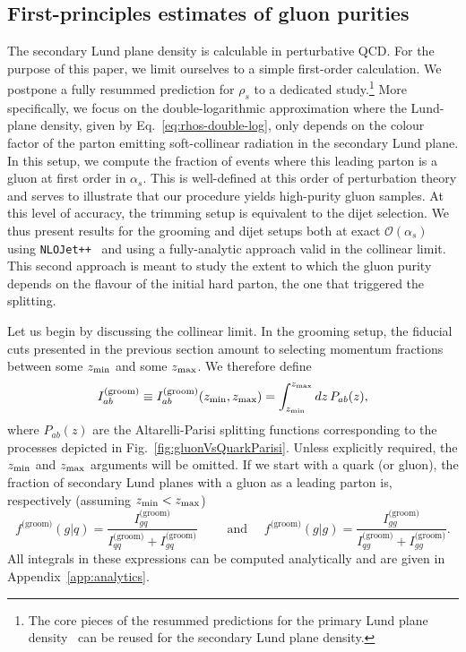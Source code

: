 \documentclass[a4paper,11pt]{article}
\newcommand{\zmin}{z_{\rm{min}}}
\newcommand{\zmax}{z_{\rm{max}}}
\begin{document}
\subsection{First-principles estimates of gluon purities}
\label{sec:analytics}
The secondary Lund plane density is calculable in perturbative QCD. For the purpose of this paper, we limit ourselves to a simple first-order calculation. We postpone a fully resummed prediction for $\rho_s$ to a dedicated study.\footnote{The core pieces of the resummed predictions for the primary Lund plane density~\cite{Lifson:2020gua} can be reused for the secondary Lund plane density.} 
%
More specifically, we focus on the double-logarithmic approximation where the Lund-plane density, given by Eq.~\eqref{eq:rhos-double-log}, only depends on the colour factor of the parton emitting soft-collinear radiation in the secondary Lund plane.
%
In this setup, we compute the fraction of events where this leading parton is a gluon at first order in $\alpha_s$. This is well-defined at this order of perturbation theory and serves to illustrate that our procedure yields high-purity gluon samples. 
%
At this level of accuracy, the trimming setup is equivalent to the dijet selection. We thus present results for the grooming and dijet setups both at exact $\mathcal{O}(\alpha_s)$ using \texttt{NLOJet++}~\cite{Nagy:2003tz} and using a fully-analytic approach valid in the collinear limit. 
%
This second approach is meant to study the extent to which the gluon purity depends on the flavour of the initial hard parton, the one that triggered the splitting.

Let us begin by discussing the collinear limit. In the grooming setup, the fiducial cuts presented in the previous section amount to selecting momentum fractions between some $\zmin$ and some $\zmax$. We therefore define
%
\begin{equation}
\label{eq:int-Pab}
I^\text{(groom)}_{ab} \equiv I^\text{(groom)}_{ab}(\zmin,\zmax) = \int_{\zmin}^{\zmax} dz\, P_{ab}(z),
\end{equation}
%
where $P_{ab}(z)$ are the Altarelli-Parisi splitting functions corresponding to the processes depicted in Fig.~\ref{fig:gluonVsQuarkParisi}. Unless explicitly required, the $\zmin$ and $\zmax$ arguments will be omitted. If we start with a quark (or gluon), the fraction of secondary Lund planes with a gluon as a leading parton is, respectively (assuming $\zmin<\zmax$)
%
\begin{equation}\label{eq:g-frac-collinear-groom}
f^\text{(groom)}(g|q) = \frac{I^\text{(groom)}_{gq}}{I^\text{(groom)}_{qq}+I^\text{(groom)}_{gq}}
\qquad\text{ and }\quad
f^\text{(groom)}(g|g) = \frac{I^\text{(groom)}_{gg}}{I^\text{(groom)}_{qg}+I^\text{(groom)}_{gg}}.
\end{equation}
%
All integrals in these expressions can be computed analytically and are given in Appendix~\ref{app:analytics}. 
\end{document}
